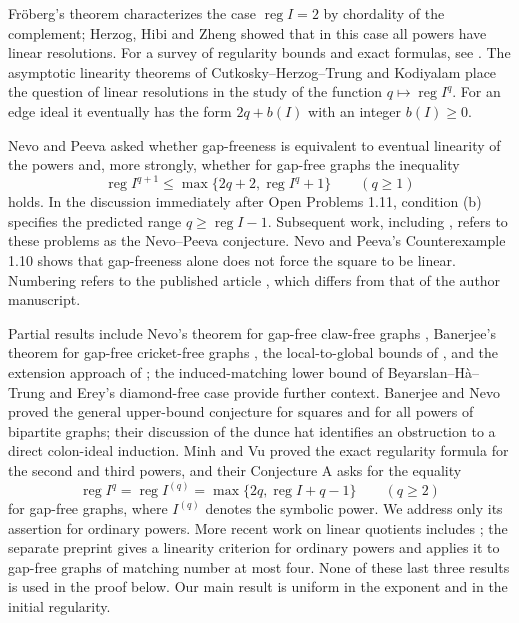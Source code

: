 \documentclass[11pt,a4paper]{article}
\theoremstyle{definition}
\newcommand{\reg}{\operatorname{reg}}
\begin{document}
Fr\"oberg's theorem \cite{Fro} characterizes the case $\reg I=2$ by chordality of the complement; Herzog, Hibi and Zheng \cite{HHZ} showed that in this case all powers have linear resolutions. For a survey of regularity bounds and exact formulas, see \cite{BBHsurvey}. The asymptotic linearity theorems of Cutkosky--Herzog--Trung and Kodiyalam \cite{CHT,Kod} place the question of linear resolutions in the study of the function $q\mapsto\reg I^q$. For an edge ideal it eventually has the form $2q+b(I)$ with an integer $b(I)\geq0$.

Nevo and Peeva \cite[Open Problems 1.11(1) and (2)]{NP} asked whether gap-freeness is equivalent to eventual linearity of the powers and, more strongly, whether for gap-free graphs the inequality
\[
 \reg I^{q+1}\leq \max\{2q+2,\reg I^q+1\}\qquad(q\geq1)
\]
holds. In the discussion immediately after Open Problems 1.11, condition (b) specifies the predicted range $q\geq\reg I-1$. Subsequent work, including \cite{BBH,BN,E26}, refers to these problems as the Nevo--Peeva conjecture. Nevo and Peeva's Counterexample 1.10 shows that gap-freeness alone does not force the square to be linear. Numbering refers to the published article \cite{NP}, which differs from that of the author manuscript.

Partial results include Nevo's theorem for gap-free claw-free graphs \cite{Nevo}, Banerjee's theorem for gap-free cricket-free graphs \cite{Ban}, the local-to-global bounds of \cite{BBH}, and the extension approach of \cite{Kanno}; the induced-matching lower bound of Beyarslan--H\`a--Trung \cite{BHT} and Erey's diamond-free case \cite{Erey18} provide further context. Banerjee and Nevo \cite{BN} proved the general upper-bound conjecture for squares and for all powers of bipartite graphs; their discussion of the dunce hat identifies an obstruction to a direct colon-ideal induction. Minh and Vu \cite[Theorem 1.3]{MV} proved the exact regularity formula for the second and third powers, and their Conjecture A \cite[p.~339]{MV} asks for the equality
\[
 \reg I^q=\reg I^{(q)}=\max\{2q,\reg I+q-1\}\qquad(q\geq2)
\]
for gap-free graphs, where $I^{(q)}$ denotes the symbolic power. We address only its assertion for ordinary powers. More recent work on linear quotients includes \cite{E26,E3}; the separate preprint \cite{D4} gives a linearity criterion for ordinary powers and applies it to gap-free graphs of matching number at most four. None of these last three results is used in the proof below. Our main result is uniform in the exponent and in the initial regularity.
\end{document}
